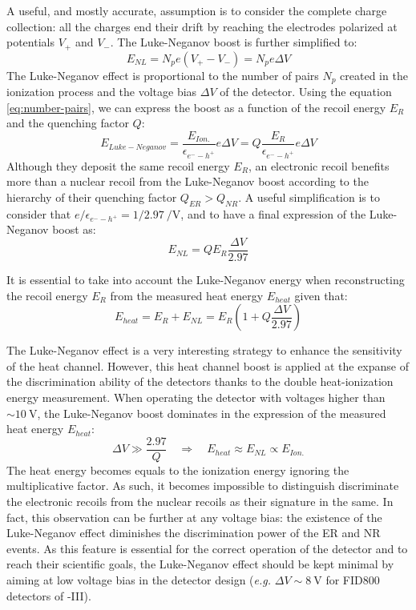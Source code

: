 A useful, and mostly accurate, assumption is to consider the complete charge collection: all the charges end their drift by reaching the electrodes polarized at potentials $V_+$ and $V_-$. The Luke-Neganov boost is further simplified to:
\begin{equation}
E_{NL} = N_p e (V_+ - V_-) = N_p e \Delta V
\end{equation}
The Luke-Neganov effect is proportional to the number of pairs $N_p$ created in the ionization process and the voltage bias $\Delta V$ of the detector. Using the equation \ref{eq:number-pairs}, we can express the boost as a function of the recoil energy $E_R$ and the quenching factor $Q$:
\begin{equation}
E_{Luke-Neganov} = \frac{E_{Ion.}}{\epsilon_{e^--h^+}} e \Delta V = Q \frac{E_R}{\epsilon_{e^--h^+}} e \Delta V
\end{equation}
Although they deposit the same recoil energy $E_R$, an electronic recoil benefits more than a nuclear recoil from the Luke-Neganov boost according to the hierarchy of their quenching factor $Q_{ER} > Q_{NR}$. 
A useful simplification is to consider that $e / \epsilon_{e^--h^+} = 1/2.97\ \si{\per\volt}$,  and to have a final expression of the Luke-Neganov boost as:
\begin{equation}
\label{eq:nl-boost}
E_{NL} = Q E_R \frac{\Delta V}{2.97}
\end{equation}

It is essential to take into account the Luke-Neganov energy when reconstructing the recoil energy $E_R$ from the measured heat energy $E_{heat}$ given that:
\begin{equation}
\label{eq:heat-energy-nl-boost}
E_{heat} = E_R + E_{NL} = E_R \left( 1 + Q \frac{\Delta V}{2.97} \right)
\end{equation}

The Luke-Neganov effect is a very interesting strategy to enhance the sensitivity of the heat channel. However, this heat channel boost is applied at the expanse of the discrimination ability of the detectors thanks to the double heat-ionization energy measurement. When operating the detector with voltages higher than $\sim \SI{10}{\volt}$, the Luke-Neganov boost dominates in the expression of the measured heat energy $E_{heat}$:
\begin{equation}
\Delta V \gg \frac{2.97}{Q}
\quad \Rightarrow \quad
E_{heat} \approx E_{NL} \propto E_{Ion.}
\end{equation}
The heat energy becomes equals to the ionization energy ignoring the multiplicative factor. As such, it becomes impossible to distinguish discriminate the electronic recoils from the nuclear recoils as their signature in the same. In fact, this observation can be further at any voltage bias: the existence of the Luke-Neganov effect diminishes the discrimination power of the ER and NR events. As this feature is essential for the correct operation of the detector and to reach their scientific goals, the Luke-Neganov effect should be kept minimal by aiming at low voltage bias in the detector design  ({\it e.g.} $\Delta V \sim \SI{8}{\volt}$ for FID800 detectors of \Edelweiss{}-III).

